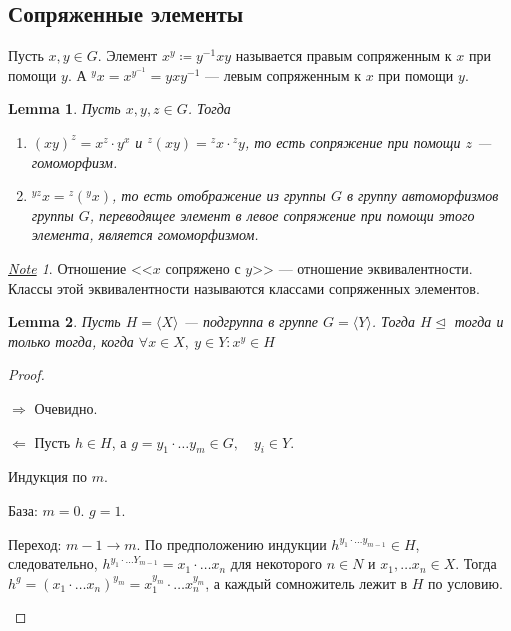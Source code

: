 \documentclass[11pt]{book}
\theoremstyle{definition}
\theoremstyle{plain}
\theoremstyle{plain}
\newtheorem{lm}{Lemma}
\theoremstyle{definition}
\theoremstyle{remark}
\newtheorem*{note}{\underline{Note}}
\begin{document}
\subsection{Сопряженные элементы}
\begin{defn}
    Пусть $ x, y \in G$. Элемент $ x^{y} \coloneqq y^{-1} x y$ называется {\sf правым сопряженным} к $ x$ при помощи  $ y$. А  $ ^{y}\!x = x ^{y^{-1}} = y x y^{-1}$ --- {\sf левым сопряженным} к $ x$ при помощи  $ y$.
\end{defn}
\begin{lm}
    Пусть $ x, y, z \in G$. Тогда
    \begin{enumerate}
	\item
	    $ (xy)^{z} = x^{z}\cdot y^{x}$ и $ ^{z}\!(xy) = {^{z}\!x}\cdot  {^{z}\!y}$, то есть сопряжение при помощи $ z$ --- гомоморфизм.
	\item
	    $ ^{yz}\!x = {^{z}\!({^{y}\!x})}$, то есть отображение из группы $ G$ в группу автоморфизмов группы  $ G$, переводящее элемент в левое сопряжение при помощи этого элемента, является гомоморфизмом.
    \end{enumerate}
\end{lm}
\begin{note}
    Отношение <<$ x$ сопряжено с  $ y$>> --- отношение эквивалентности. Классы этой эквивалентности называются {\sf классами сопряженных элементов}.
\end{note}
\begin{lm}\label{lm_com}
    Пусть  $ H = \langle X \rangle$ --- подгруппа в группе $ G = \langle Y \rangle$. Тогда $ H \trianglelefteq $ тогда и только тогда, когда $ \forall x \in X ,~ y \in Y: x^{y} \in H$
\end{lm}
\begin{proof}
    $ $
    \begin{description}
	\item $ \boxed{ \Longrightarrow }$ Очевидно.
	\item $ \boxed{ \Longleftarrow }$ Пусть $ h \in  H$, а $ g = y_1 \cdot \ldots y_m \in G, \quad y_i \in Y$.

	    Индукция по $ m$.
	    \begin{description}
		\item База: $ m=0$.  $ g = 1$.
		\item Переход:  $ m-1 \to  m$.
		    По предположению индукции $ h^{y_1 \cdot \ldots y_{m-1}} \in H$, следовательно, $ h^{y_1 \cdot \ldots  Y_{m-1}} = x_1 \cdot  \ldots x_n$ для некоторого  $ n \in N$ и $ x_1, \ldots x_n \in X$.
		    Тогда $ h^{g} = (x_1 \cdot  \ldots x_n)^{y_m} = x_1^{y_m} \cdot  \ldots x_n^{y_{m}}$, а каждый сомножитель лежит в $ H $ по условию.
	    \end{description}
    \end{description}
\end{proof}
\end{document}

